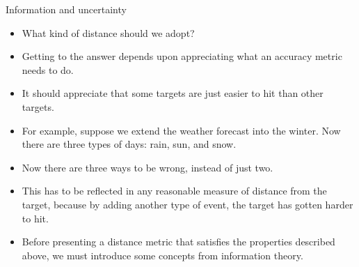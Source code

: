 \documentclass[handout]{beamer}
\begin{document}
\begin{frame}{Information and uncertainty}
\scriptsize{

\begin{itemize}

\item What kind of distance should we adopt?

\item Getting to the answer depends upon appreciating what an accuracy metric needs to do.

\item It should appreciate that some targets are just easier to hit than other targets. 
\item For example, suppose we extend the weather forecast into the winter. Now there are three types of days:
rain, sun, and snow.
\item Now there are three ways to be wrong, instead of just two.
\item This has to be reflected in any reasonable measure of distance from the target, because by adding another type of event, the target has gotten harder to hit.

\item Before presenting a distance metric that satisfies the properties described above, we must introduce some concepts from information theory.

\end{itemize}


} 
\end{frame}
\end{document}
